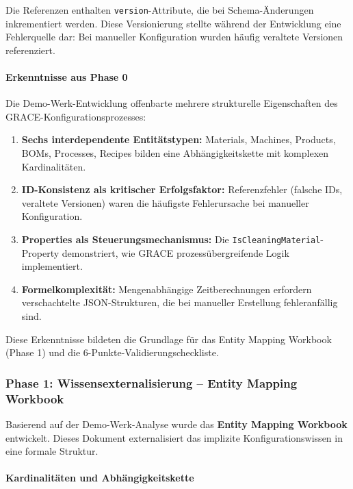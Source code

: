 Die Referenzen enthalten \texttt{version}-Attribute, die bei Schema-Änderungen inkrementiert werden. Diese Versionierung stellte während der Entwicklung eine Fehlerquelle dar: Bei manueller Konfiguration wurden häufig veraltete Versionen referenziert.


\paragraph{Erkenntnisse aus Phase 0}

Die Demo-Werk-Entwicklung offenbarte mehrere strukturelle Eigenschaften des GRACE-Konfigurationsprozesses:

\begin{enumerate}
    \item \textbf{Sechs interdependente Entitätstypen:} Materials, Machines, Products, BOMs, Processes, Recipes bilden eine Abhängigkeitskette mit komplexen Kardinalitäten.

    \item \textbf{ID-Konsistenz als kritischer Erfolgsfaktor:} Referenzfehler (falsche IDs, veraltete Versionen) waren die häufigste Fehlerursache bei manueller Konfiguration.

    \item \textbf{Properties als Steuerungsmechanismus:} Die \texttt{IsCleaningMaterial}-Property demonstriert, wie GRACE prozessübergreifende Logik implementiert.

    \item \textbf{Formelkomplexität:} Mengenabhängige Zeitberechnungen erfordern verschachtelte JSON-Strukturen, die bei manueller Erstellung fehleranfällig sind.
\end{enumerate}

Diese Erkenntnisse bildeten die Grundlage für das Entity Mapping Workbook (Phase 1) und die 6-Punkte-Validierungscheckliste.


\subsubsection{Phase 1: Wissensexternalisierung -- Entity Mapping Workbook}
\label{subsubsec:Phase1}

Basierend auf der Demo-Werk-Analyse wurde das \textbf{Entity Mapping Workbook} entwickelt. Dieses Dokument externalisiert das implizite Konfigurationswissen in eine formale Struktur.

\paragraph{Kardinalitäten und Abhängigkeitskette}

